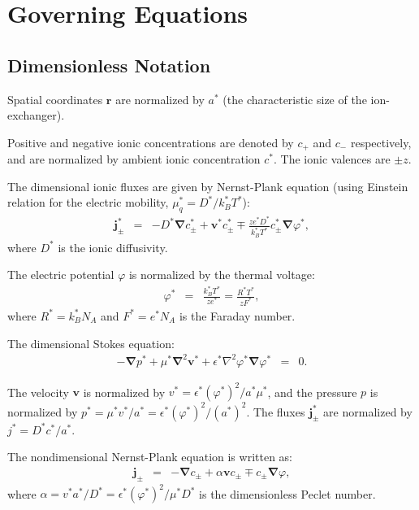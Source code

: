 \documentclass[final]{elsarticle}
\newcommand\eps \epsilon
\newcommand\Laplacian{\nabla^2}
\newcommand\bnabla{\boldsymbol{\nabla}}
\newcommand\bLaplacian{\boldsymbol{\nabla}^2}
\newcommand\bv{\boldsymbol{v}}
\newcommand\bj{\boldsymbol{j}}
\newcommand\br{\boldsymbol{r}}
\begin{document}
\section{Governing Equations} \label{sec:equations}

\subsection{Dimensionless Notation}

Spatial coordinates $\br$ are normalized by $a^*$ (the characteristic size of the ion-exchanger).

Positive and negative ionic concentrations are denoted by $c_+$ and $c_-$ respectively, and
are normalized by ambient ionic concentration $c^*$. The ionic valences are $\pm z$.

The dimensional ionic fluxes are given by Nernst-Plank equation 
(using Einstein relation for the electric mobility, $\mu_q^* = D^* / k_B^* T^*$):
\begin{eqnarray*}
\bj^*_\pm &=& 
-D^* \bnabla c^*_\pm + \bv^* c^*_\pm \mp \frac{z e^* D^*}{k_B^* T^*} c^*_\pm \bnabla \varphi^*,
\end{eqnarray*}
where $D^*$ is the ionic diffusivity.

The electric potential $\varphi$ is normalized by the thermal voltage:
\begin{eqnarray*}
\varphi^* &=& \frac{k_B^* T^*}{z e^*} = \frac{R^* T^*}{z F^*},
\end{eqnarray*}
where $R^* = k_B^* N_A$ and $F^* = e^* N_A$ is the Faraday number.

The dimensional Stokes equation:
\begin{eqnarray*}
-\bnabla p^* + \mu^* \bLaplacian \bv^* + \eps^* \Laplacian \varphi^* \bnabla \varphi^* &=& 0.
\end{eqnarray*}

The velocity $\bv$ is normalized by $v^* = {\eps^* (\varphi^*)^2}/{a^* \mu^*}$,
and the pressure $p$ is normalized by $p^* = {\mu^* v^*}/{a^*} = {\eps^* (\varphi^*)^2}/{(a^*)^2}$.
The fluxes $\bj^*_\pm$ are normalized by $j^* = {D^* c^*}/{a^*}$.

The nondimensional Nernst-Plank equation is written as:
\begin{eqnarray*}
\bj_\pm &=& 
-\bnabla c_\pm + \alpha \bv c_\pm \mp c_\pm \bnabla \varphi,
\end{eqnarray*}
where $\alpha = {v^* a^*}/{D^*} = {\eps^* (\varphi^*)^2}/{\mu^* D^*}$ 
is the dimensionless Peclet number.
\end{document}
